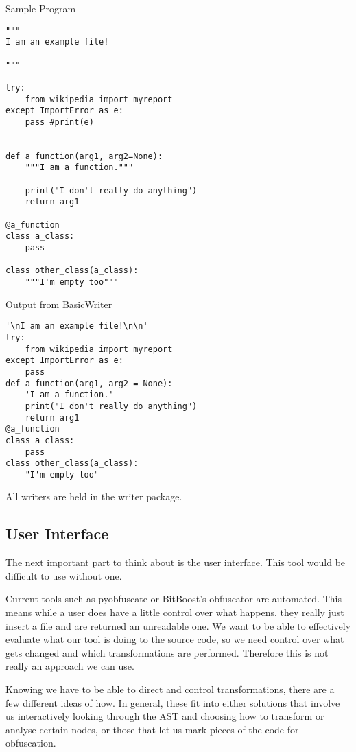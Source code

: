 \documentclass{report}
\begin{document}
\begin{minipage}[t]{0.45\linewidth}
Sample Program

\lstset{basicstyle=\tiny}
\begin{lstlisting}
"""
I am an example file!

"""

try:
    from wikipedia import myreport
except ImportError as e:
    pass #print(e)


def a_function(arg1, arg2=None):
    """I am a function."""

    print("I don't really do anything")
    return arg1

@a_function
class a_class:
    pass

class other_class(a_class):
    """I'm empty too"""
\end{lstlisting}
\end{minipage}
\hspace{0.5cm}
\begin{minipage}[t]{0.45\linewidth}
Output from BasicWriter

\lstset{basicstyle=\tiny}
\begin{lstlisting}
'\nI am an example file!\n\n'
try:
    from wikipedia import myreport
except ImportError as e:
    pass
def a_function(arg1, arg2 = None):
    'I am a function.'
    print("I don't really do anything")
    return arg1
@a_function
class a_class:
    pass
class other_class(a_class):
    "I'm empty too"
\end{lstlisting}
\end{minipage}

All writers are held in the writer package.

\subsection{User Interface}

The next important part to think about is the user interface. This tool would be difficult to use without one.

Current tools such as pyobfuscate or BitBoost's obfuscator are automated. This means while a user does have a little control
over what happens, they really just insert a file and are returned an unreadable one. We want to be able to effectively
evaluate what our tool is doing to the source code, so we need control over what gets changed and which transformations are
performed. Therefore this is not really an approach we can use.

Knowing we have to be able to direct and control transformations, there are a few different ideas of how. In general, these fit into
either solutions that involve us interactively looking through the AST and choosing how to transform or analyse certain
nodes, or those that let us mark pieces of the code for obfuscation.
\end{document}
